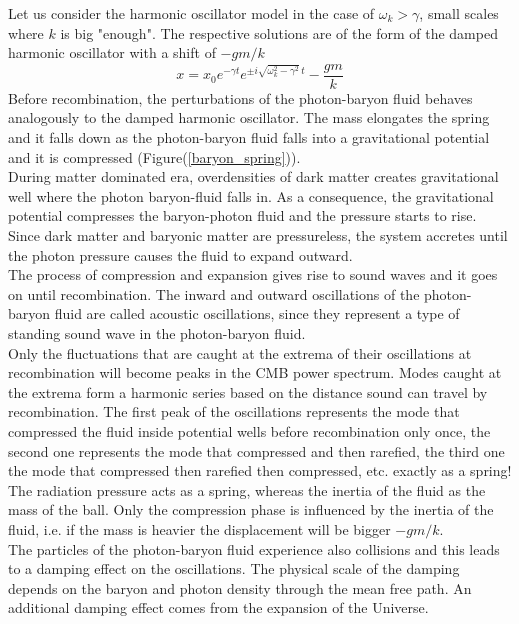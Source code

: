 \documentclass{article}
\begin{document}
Let us consider the harmonic oscillator model in the case of $\omega_k > \gamma$, small scales where $k$ is big "enough".
The respective solutions are of the form of the damped harmonic oscillator with a shift of $-gm/k$
\[
x = x_0 e^{-\gamma t} e^{\pm i \sqrt{\omega_k ^2 - \gamma ^2} \, t} - \dfrac{g m}{k}
\]
Before recombination, the perturbations of the photon-baryon fluid behaves analogously to the damped harmonic oscillator.
The mass elongates the spring and it falls down as the photon-baryon fluid falls into a gravitational potential and it is compressed (Figure(\ref{baryon_spring})).\\
During matter dominated era, overdensities of dark matter creates gravitational well where the photon baryon-fluid falls in.
As a consequence, the gravitational potential compresses the baryon-photon fluid and the pressure starts to rise.
Since dark matter and baryonic matter are pressureless, the system accretes until the photon pressure causes the fluid to expand outward.\\
The process of compression and expansion gives rise to sound waves and it goes on until recombination.
The inward and outward oscillations of the photon-baryon fluid are called acoustic oscillations, since they represent a type of standing sound wave in the photon-baryon fluid\cite{RydenIntroCosmoPdf}.\\
Only the fluctuations that are caught at the extrema of their oscillations at recombination will become peaks in the CMB power spectrum.
Modes caught at the extrema form a harmonic series based on the distance sound can travel by recombination.
The first peak of the oscillations represents the mode that compressed the fluid inside potential wells before recombination only once, the second one represents the mode that compressed and then rarefied, the third one the mode that compressed then rarefied then compressed, etc. exactly as a spring!\\
The radiation pressure acts as a spring, whereas the inertia of the fluid as the mass of the ball.
Only the compression phase is influenced by the inertia of the fluid, i.e. if the mass is heavier the displacement will be bigger $-gm/k$.
\\
The particles of the photon-baryon fluid experience also collisions and this leads to a damping effect on the oscillations.
The physical scale of the damping depends on the baryon and photon density through the mean free path.
An additional damping effect comes from the expansion of the Universe.
\end{document}
